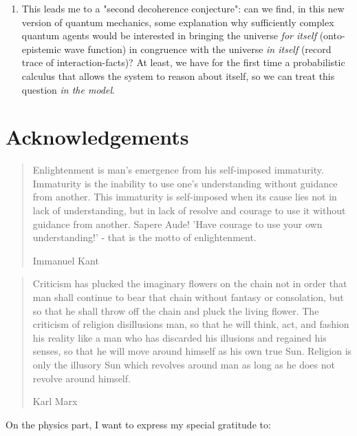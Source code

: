 \documentclass{article}
\begin{document}
\begin{enumerate}
\item This leads me to a "second decoherence conjecture": can we find, in this new version of quantum mechanics, some explanation why sufficiently complex quantum agents would be interested in bringing the universe \textit{for itself} (onto-epistemic wave function) in congruence with the universe \textit{in itself} (record trace of interaction-facts)? At least, we have for the first time a probabilistic calculus that allows the system to reason about itself, so we can treat this question \textit{in the model}.

\end{enumerate}

\pagebreak

\section{Acknowledgements}

\blockquote[Immanuel Kant]{
Enlightenment is man's emergence from his self-imposed immaturity. Immaturity is the inability to use one’s understanding without guidance from another. This immaturity is self-imposed when its cause lies not in lack of understanding, but in lack of resolve and courage to use it without guidance from another. Sapere Aude! 'Have courage to use your own understanding!' - that is the motto of enlightenment.
}

\blockquote[Karl Marx]{
Criticism has plucked the imaginary flowers on the chain not in order that man shall continue to bear that chain without fantasy or consolation, but so that he shall throw off the chain and pluck the living flower. The criticism of religion disillusions man, so that he will think, act, and fashion his reality like a man who has discarded his illusions and regained his senses, so that he will move around himself as his own true Sun. Religion is only the illusory Sun which revolves around man as long as he does not revolve around himself. 
}


On the physics part, I want to express my special gratitude to:
\end{document}
